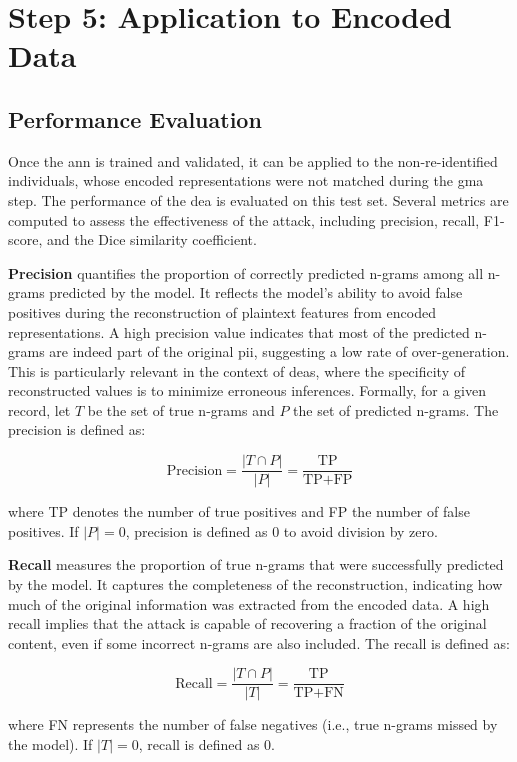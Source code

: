 \section{Step 5: Application to Encoded Data} \label{sec:application}

\subsection{Performance Evaluation}

Once the \ac{ann} is trained and validated, it can be applied to the non-re-identified individuals, whose encoded representations were not matched during the \ac{gma} step.
The performance of the \ac{dea} is evaluated on this test set.
Several metrics are computed to assess the effectiveness of the attack, including precision, recall, F1-score, and the Dice similarity coefficient.

\textbf{Precision} quantifies the proportion of correctly predicted n-grams among all n-grams predicted by the model.
It reflects the model’s ability to avoid false positives during the reconstruction of plaintext features from encoded representations.
A high precision value indicates that most of the predicted n-grams are indeed part of the original \ac{pii}, suggesting a low rate of over-generation.
This is particularly relevant in the context of \ac{dea}s, where the specificity of reconstructed values is to minimize erroneous inferences.
Formally, for a given record, let $T$ be the set of true n-grams and $P$ the set of predicted n-grams.
The precision is defined as:

\[
\text{Precision} = \frac{|T \cap P|}{|P|} = \frac{\text{TP}}{\text{TP} + \text{FP}}
\]

where TP denotes the number of true positives and FP the number of false positives. If $|P| = 0$, precision is defined as 0 to avoid division by zero.

\textbf{Recall} measures the proportion of true n-grams that were successfully predicted by the model.
It captures the completeness of the reconstruction, indicating how much of the original information was extracted from the encoded data.
A high recall implies that the attack is capable of recovering a  fraction of the original content, even if some incorrect n-grams are also included.
The recall is defined as:

\[
\text{Recall} = \frac{|T \cap P|}{|T|} = \frac{\text{TP}}{\text{TP} + \text{FN}}
\]

where FN represents the number of false negatives (i.e., true n-grams missed by the model).
If $|T| = 0$, recall is defined as 0.

